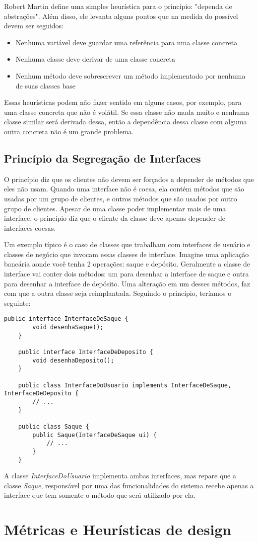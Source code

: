 Robert Martin define uma simples heurística para o princípio: "dependa de abstrações". Além disso, ele levanta alguns pontos
que na medida do possível devem ser seguidos:

\begin{itemize}
	\item Nenhuma variável deve guardar uma referência para uma classe concreta
	\item Nenhuma classe deve derivar de uma classe concreta
	\item Nenhum método deve sobrescrever um método implementado por nenhuma de suas classes base
\end{itemize}

Essas heurísticas podem não fazer sentido em alguns casos, por exemplo, para uma classe concreta que não é volátil. Se essa classe
não muda muito e nenhuma classe similar será derivada dessa, então a dependência dessa classe com alguma outra concreta
não é um grande problema.

\subsection{Princípio da Segregação de Interfaces}
\label{subsec:isp}

O princípio diz que os clientes não devem ser forçados a depender de métodos que eles não usam. Quando uma interface não é coesa,
ela contém métodos que são usadas por um grupo de clientes, e outros métodos que são usados por outro grupo de clientes. Apesar de uma
classe poder implementar mais de uma interface, o princípio diz que o cliente da classe deve apenas depender de interfaces
coesas.

Um exemplo típico é o caso de classes que trabalham com interfaces de usuário e classes de negócio que invocam essas classes
de interface. Imagine uma aplicação bancária aonde você tenha 2 operações: saque e depósito. Geralmente a classe de interface 
vai conter dois métodos: um para desenhar a interface de saque e outra para desenhar a interface de depósito. Uma alteração em
um desses métodos, faz com que a outra classe seja reimplantada. Seguindo o princípio, teríamos o seguinte:

\begin{lstlisting}[frame=trbl]
	public interface InterfaceDeSaque {
		void desenhaSaque();
	}
	
	public interface InterfaceDeDeposito {
		void desenhaDeposito();
	}
	
	public class InterfaceDoUsuario implements InterfaceDeSaque, InterfaceDeDeposito {
		// ...
	}
	
	public class Saque {
		public Saque(InterfaceDeSaque ui) { 
			// ...
		}
	}
\end{lstlisting}

A classe \textit{InterfaceDoUsuario} implementa ambas interfaces, mas repare que a classe \textit{Saque}, responsável por
uma das funcionalidades do sistema recebe apenas a interface que tem somente o método que será utilizado por ela.

\section{Métricas e Heurísticas de design}

